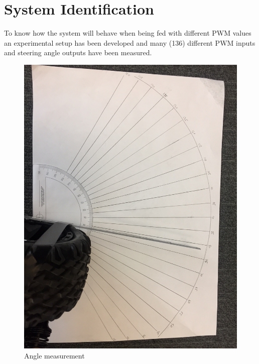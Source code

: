 


\section{System Identification}
To know how the system will behave when being fed with different PWM values an experimental setup has been developed and many (136) different PWM inputs and steering angle outputs have been measured.


\begin{figure}[H]
  \includegraphics[width=\textwidth]{./img/anglepic.JPG}
  \centering
  \caption{Angle measurement}
  \label{fig:Angle measurement}
\end{figure}



